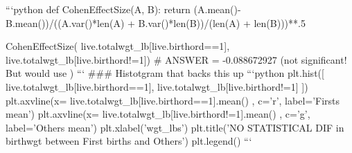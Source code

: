 ```python
def CohenEffectSize(A, B):
    return (A.mean()-B.mean())/((A.var()*len(A) + B.var()*len(B))/(len(A) + len(B)))**.5  

CohenEffectSize( live.totalwgt_lb[live.birthord==1], live.totalwgt_lb[live.birthord!=1])   # ANSWER = -0.088672927 (not significant! But would use )
```
### Histotgram that backs this up
```python
plt.hist([ live.totalwgt_lb[live.birthord==1],  live.totalwgt_lb[live.birthord!=1] ])
plt.axvline(x= live.totalwgt_lb[live.birthord==1].mean() , c='r',  label='Firsts mean')
plt.axvline(x= live.totalwgt_lb[live.birthord!=1].mean() , c='g',   label='Others mean')
plt.xlabel('wgt_lbs')
plt.title('NO STATISTICAL DIF in birthwgt between First births and Others')
plt.legend()
```